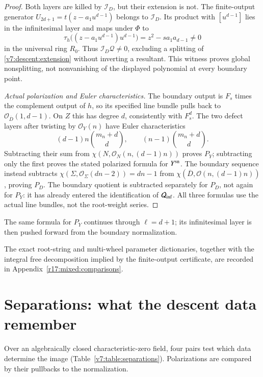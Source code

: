 \documentclass[10pt,fleqn]{article}
\numberwithin{equation}{section}
\begin{document}
\begin{proof}
Both layers are killed by $\mathcal I_D$, but their extension is not.
The finite-output generator
$U_{2d+1}=t(z-a_1u^{d-1})$ belongs to $\mathcal I_D$.
Its product with $[u^{d-1}]$ lies in the infinitesimal layer and maps under
$\Phi$ to
\[
 \tau_h\bigl((z-a_1u^{d-1})u^{d-1}\bigr)
       =z^2-sa_1a_{d-1}\ne0
\]
in the universal ring $R_0$.  Thus $\mathcal I_D\mathcal Q\ne0$,
excluding a splitting of \eqref{v7:descent:extension} without inverting
a resultant.  This witness proves global nonsplitting, not nonvanishing
of the displayed polynomial at every boundary point.

\emph{Actual polarization and Euler characteristics.}
The boundary output is $F_s$ times the complement output of $h$, so its
specified line bundle pulls back to $\mathcal O_{\overline D}(1,d-1)$.
On $Z$ this has degree $d$, consistently with $F_s^d$.
The two defect layers after twisting by $\mathcal O_Y(n)$ have Euler
characteristics
\[
 (d-1)n\binom{m_n+d}{d},\qquad
 (n-1)\binom{m_n+d}{d}.
\]
Subtracting their sum from
$\chi(N,\mathcal O_N(n,(d-1)n))$ proves $P_Y$; subtracting only the
first proves the stated polarized formula for $Y^{\rm sn}$.
The boundary sequence instead subtracts $\chi(\Sigma,\mathcal O_\Sigma(dn-2))
=dn-1$ from $\chi(\overline D,\mathcal O(n,(d-1)n))$, proving $P_D$.
The boundary quotient is subtracted separately for $P_D$, not again
for $P_Y$: it has already entered the identification of $\mathcal Q_{\rm inf}$.
All three formulas use the actual line bundles, not the root-weight series.
\end{proof}

The same formula for $P_Y$ continues through $\ell=d+1$; its
infinitesimal layer is then pushed forward from the boundary normalization.

The exact root-string and multi-wheel parameter dictionaries, together
with the integral free decomposition implied by the finite-output
certificate, are recorded in Appendix~\ref{r17:mixed:comparisons}.


\section{Separations: what the descent data remember}\label{v7:sec:separations}

Over an algebraically closed characteristic-zero field, four pairs test
which data determine the image (Table~\ref{v7:table:separations}).
Polarizations are compared by their pullbacks to the normalization.
\end{document}
